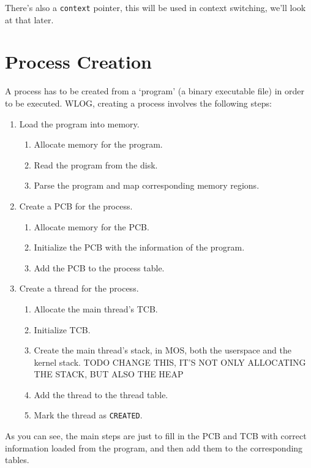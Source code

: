 There's also a \texttt{context} pointer, this will be used in context switching, we'll look at
that later.

\section{Process Creation}

A process has to be created from a `program' (a binary executable file) in order to be
executed. WLOG, creating a process involves the following steps:

\begin{enumerate}
    \item Load the program into memory.
          \begin{enumerate}
              \item Allocate memory for the program.
              \item Read the program from the disk.
              \item Parse the program and map corresponding memory regions.
          \end{enumerate}
    \item Create a PCB for the process.
          \begin{enumerate}
              \item Allocate memory for the PCB.
              \item Initialize the PCB with the information of the program.
              \item Add the PCB to the process table.
          \end{enumerate}
    \item Create a thread for the process.
          \begin{enumerate}
              \item Allocate the main thread's TCB.
              \item Initialize TCB.
              \item Create the main thread's stack, in MOS, both the userspace and the kernel stack.
                    TODO CHANGE THIS, IT'S NOT ONLY ALLOCATING THE STACK, BUT ALSO THE HEAP
              \item Add the thread to the thread table.
              \item Mark the thread as \texttt{CREATED}.
          \end{enumerate}
\end{enumerate}

As you can see, the main steps are just to fill in the PCB and TCB with correct information loaded
from the program, and then add them to the corresponding tables.
